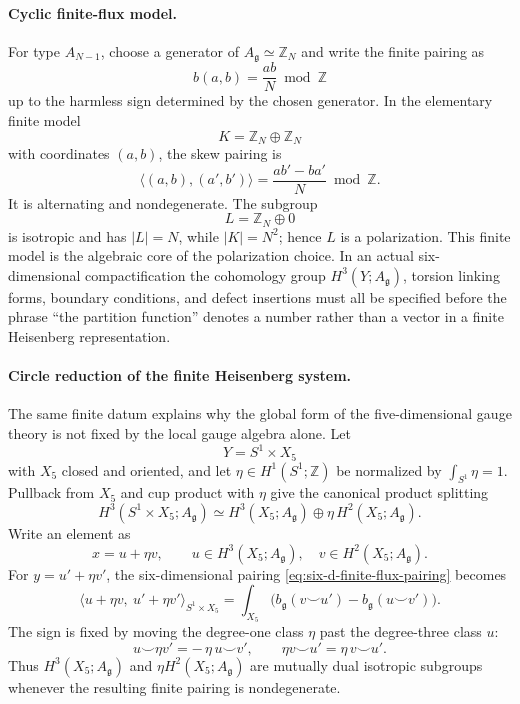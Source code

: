 \paragraph{Cyclic finite-flux model.}
For type \(A_{N-1}\), choose a generator of
\(A_{\mathfrak g}\simeq\mathbb Z_N\) and write the finite pairing as
\[
  b(a,b)=\frac{ab}{N}\bmod\mathbb Z
\]
up to the harmless sign determined by the chosen generator.  In the elementary
finite model
\[
  K=\mathbb Z_N\oplus\mathbb Z_N
\]
with coordinates \((a,b)\), the skew pairing is
\begin{equation}
  \langle(a,b),(a',b')\rangle
  =
  \frac{ab'-ba'}{N}\bmod\mathbb Z .
  \label{eq:six-d-cyclic-finite-flux-pairing}
\end{equation}
It is alternating and nondegenerate.  The subgroup
\[
  L=\mathbb Z_N\oplus0
\]
is isotropic and has \(|L|=N\), while \(|K|=N^2\); hence \(L\) is a
polarization.  This finite model is the algebraic core of the polarization
choice.  In an actual six-dimensional compactification the cohomology group
\(H^3(Y;A_{\mathfrak g})\), torsion linking forms, boundary conditions, and
defect insertions must all be specified before the phrase ``the partition
function'' denotes a number rather than a vector in a finite Heisenberg
representation.

\paragraph{Circle reduction of the finite Heisenberg system.}
The same finite datum explains why the global form of the five-dimensional
gauge theory is not fixed by the local gauge algebra alone.  Let
\[
  Y=S^1\times X_5
\]
with \(X_5\) closed and oriented, and let
\(\eta\in H^1(S^1;\mathbb Z)\) be normalized by
\(\int_{S^1}\eta=1\).  Pullback from \(X_5\) and cup product with \(\eta\)
give the canonical product splitting
\begin{equation}
  H^3(S^1\times X_5;A_{\mathfrak g})
  \simeq
  H^3(X_5;A_{\mathfrak g})
  \oplus
  \eta\,H^2(X_5;A_{\mathfrak g}) .
  \label{eq:six-d-circle-finite-flux-splitting}
\end{equation}
Write an element as
\[
  x=u+\eta v,\qquad
  u\in H^3(X_5;A_{\mathfrak g}),\quad
  v\in H^2(X_5;A_{\mathfrak g}).
\]
For \(y=u'+\eta v'\), the six-dimensional pairing
\eqref{eq:six-d-finite-flux-pairing} becomes
\begin{equation}
  \langle u+\eta v,\ u'+\eta v'\rangle_{S^1\times X_5}
  =
  \int_{X_5}
  \bigl(
    b_{\mathfrak g}(v\smile u')
    -
    b_{\mathfrak g}(u\smile v')
  \bigr) .
  \label{eq:six-d-circle-finite-flux-pairing}
\end{equation}
The sign is fixed by moving the degree-one class \(\eta\) past the
degree-three class \(u\):
\[
  u\smile\eta v'=-\,\eta\,u\smile v',
  \qquad
  \eta v\smile u'=\eta\,v\smile u' .
\]
Thus \(H^3(X_5;A_{\mathfrak g})\) and
\(\eta H^2(X_5;A_{\mathfrak g})\) are mutually dual isotropic subgroups
whenever the resulting finite pairing is nondegenerate.

